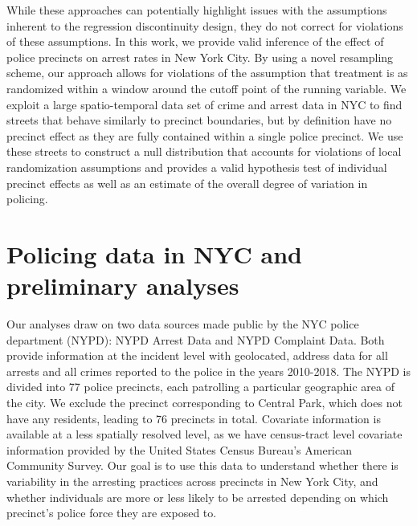 \documentclass[a4paper,11pt]{article}
\begin{document}
While these approaches can potentially highlight issues with the assumptions inherent to the regression discontinuity design, they do not correct for violations of these assumptions. In this work, we provide valid inference of the effect of police precincts on arrest rates in New York City. By using a novel resampling scheme, our approach allows for violations of the assumption that treatment is as randomized within a window around the cutoff point of the running variable. We exploit a large spatio-temporal data set of crime and arrest data in NYC to find streets that behave similarly to precinct boundaries, but by definition have no precinct effect as they are fully contained within a single police precinct. We use these streets to construct a null distribution that accounts for violations of local randomization assumptions and provides a valid hypothesis test of individual precinct effects as well as an estimate of the overall degree of variation in policing. 



\section{Policing data in NYC and preliminary analyses}
\label{sec:data}
Our analyses draw on two data sources made public  by the NYC police department (NYPD): NYPD Arrest Data and NYPD Complaint Data. Both provide information at the incident level with geolocated, address data for all arrests and all crimes reported to the police in the years 2010-2018. The NYPD is divided into 77 police precincts, each patrolling a particular geographic area of the city. We exclude the precinct corresponding to Central Park, which does not have any residents, leading to 76 precincts in total.  Covariate information is available at a less spatially resolved level, as we have census-tract level covariate information provided by the United States Census Bureau's American Community Survey. Our goal is to use this data to understand whether there is variability in the arresting practices across precincts in New York City, and whether individuals are more or less likely to be arrested depending on which precinct's police force they are exposed to.
\end{document}
